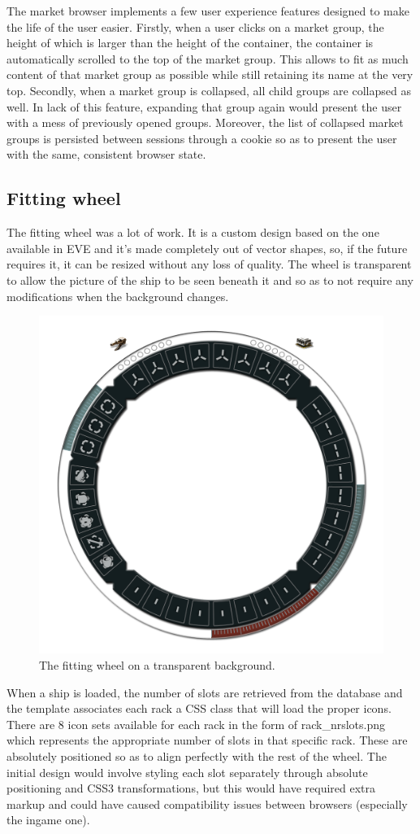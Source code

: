 The market browser implements a few user experience features designed to make the life of the user easier. Firstly, when a user clicks on a market group, the height of which is larger than the height of the container, the container is automatically scrolled to the top of the market group. This allows to fit as much content of that market group as possible while still retaining its name at the very top. Secondly, when a market group is collapsed, all child groups are collapsed as well. In lack of this feature, expanding that group again would present the user with a mess of previously opened groups. Moreover, the list of collapsed market groups is persisted between sessions through a cookie so as to present the user with the same, consistent browser state.

\subsection{Fitting wheel}
The fitting wheel was a lot of work. It is a custom design based on the one available in EVE and it’s made completely out of vector shapes, so, if the future requires it, it can be resized without any loss of quality. The wheel is transparent to allow the picture of the ship to be seen beneath it and so as to not require any modifications when the background changes.

\begin{figure}[h]
\centering
\includegraphics[width=0.7\linewidth]{src/img/wheel}
\caption{The fitting wheel on a transparent background.}
\label{fig:wheel}
\end{figure}

When a ship is loaded, the number of slots are retrieved from the database and the template associates each rack a CSS class that will load the proper icons. There are 8 icon sets available for each rack in the form of rack\_nrslots.png which represents the appropriate number of slots in that specific rack. These are absolutely positioned so as to align perfectly with the rest of the wheel. The initial design would involve styling each slot separately through absolute positioning and CSS3 transformations, but this would have required extra markup and could have caused compatibility issues between browsers (especially the ingame one).

